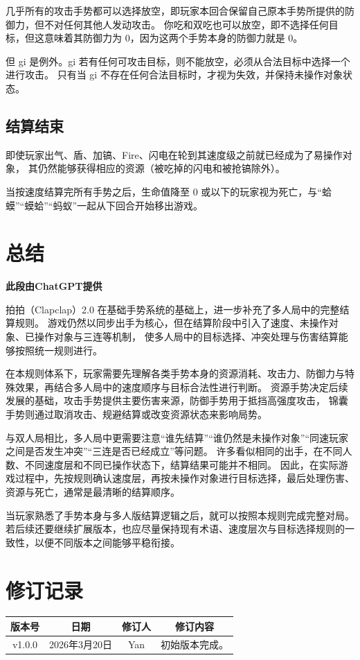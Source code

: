 \documentclass[12pt]{ctexart}
\begin{document}
几乎所有的攻击手势都可以选择放空，即玩家本回合保留自己原本手势所提供的防御力，但不对任何其他人发动攻击。
你吃和双吃也可以放空，即不选择任何目标，但这意味着其防御力为 0，因为这两个手势本身的防御力就是 0。

但 gi 是例外。gi 若有任何可攻击目标，则不能放空，必须从合法目标中选择一个进行攻击。
只有当 gi 不存在任何合法目标时，才视为失效，并保持未操作对象状态。

\subsection{结算结束}

即使玩家出气、盾、加镐、Fire、闪电在轮到其速度级之前就已经成为了易操作对象，
其仍然能够获得相应的资源（被吃掉的闪电和被抢镐除外）。

当按速度结算完所有手势之后，生命值降至 0 或以下的玩家视为死亡，与“蛤蟆”“蟆蛤”“蚂蚁”一起从下回合开始移出游戏。

\section{总结}

\textbf{此段由ChatGPT提供}

拍拍（Clapclap）2.0 在基础手势系统的基础上，进一步补充了多人局中的完整结算规则。
游戏仍然以同步出手为核心，但在结算阶段中引入了速度、未操作对象、已操作对象与三连等机制，
使多人局中的目标选择、冲突处理与伤害结算能够按照统一规则进行。

在本规则体系下，玩家需要先理解各类手势本身的资源消耗、攻击力、防御力与特殊效果，再结合多人局中的速度顺序与目标合法性进行判断。
资源手势决定后续发展的基础，攻击手势提供主要伤害来源，防御手势用于抵挡高强度攻击，
锦囊手势则通过取消攻击、规避结算或改变资源状态来影响局势。

与双人局相比，多人局中更需要注意“谁先结算”“谁仍然是未操作对象”“同速玩家之间是否发生冲突”“三连是否已经成立”等问题。
许多看似相同的出手，在不同人数、不同速度层和不同已操作状态下，结算结果可能并不相同。
因此，在实际游戏过程中，先按规则确认速度层，再按未操作对象进行目标选择，最后处理伤害、资源与死亡，通常是最清晰的结算顺序。

当玩家熟悉了手势本身与多人版结算逻辑之后，就可以按照本规则完成完整对局。
若后续还要继续扩展版本，也应尽量保持现有术语、速度层次与目标选择规则的一致性，以便不同版本之间能够平稳衔接。

\newpage
\section*{修订记录}

\begin{center}
\begin{tabular}{|c|c|c|c|}
\hline
版本号 & 日期 & 修订人 & 修订内容 \\
\hline
v1.0.0 & 2026年3月20日 & Yan & 初始版本完成。 \\
\hline
\end{tabular}
\end{center}
\end{document}
